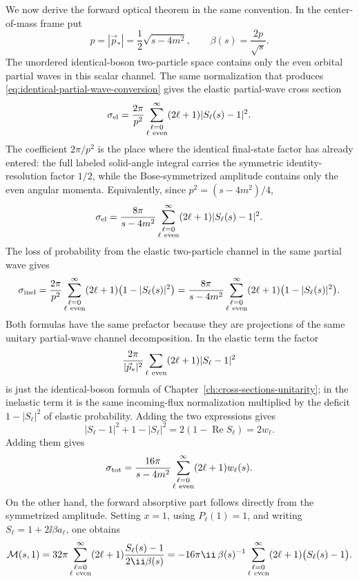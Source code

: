 We now derive the forward optical theorem in the same convention.  In the
center-of-mass frame put
\[
  p=|\vec p_*|=\frac12\sqrt{s-4m^2},
  \qquad
  \beta(s)=\frac{2p}{\sqrt s}.
\]
The unordered identical-boson two-particle space contains only the even
orbital partial waves in this scalar channel.  The same normalization that
produces \eqref{eq:identical-partial-wave-conversion} gives the elastic
partial-wave cross section
\[
  \sigma_{\rm el}
  =
  \frac{2\pi}{p^2}
  \sum_{\substack{\ell=0\\ \ell\ {\rm even}}}^{\infty}
  (2\ell+1)|S_\ell(s)-1|^2 .
\]
The coefficient \(2\pi/p^2\) is the place where the identical final-state
factor has already entered: the full labeled solid-angle integral carries the
symmetric identity-resolution factor \(1/2\), while the Bose-symmetrized
amplitude contains only the even angular momenta.
Equivalently, since \(p^2=(s-4m^2)/4\),
\[
  \sigma_{\rm el}
  =
  \frac{8\pi}{s-4m^2}
  \sum_{\substack{\ell=0\\ \ell\ {\rm even}}}^{\infty}
  (2\ell+1)|S_\ell(s)-1|^2 .
\]
The loss of probability from the elastic two-particle channel in the same
partial wave gives
\[
  \sigma_{\rm inel}
  =
  \frac{2\pi}{p^2}
  \sum_{\substack{\ell=0\\ \ell\ {\rm even}}}^{\infty}
  (2\ell+1)\bigl(1-|S_\ell(s)|^2\bigr)
  =
  \frac{8\pi}{s-4m^2}
  \sum_{\substack{\ell=0\\ \ell\ {\rm even}}}^{\infty}
  (2\ell+1)\bigl(1-|S_\ell(s)|^2\bigr).
\]
Both formulas have the same prefactor because they are projections of the same
unitary partial-wave channel decomposition.  In the elastic term the factor
\[
  \frac{2\pi}{|\vec p_*|^2}
  \sum_{\ell\ {\rm even}}(2\ell+1)|S_\ell-1|^2
\]
is just the identical-boson formula of
Chapter~\ref{ch:cross-sections-unitarity}; in the inelastic term it is the
same incoming-flux normalization multiplied by the deficit
\(1-|S_\ell|^2\) of elastic probability.  Adding the two expressions gives
\[
  |S_\ell-1|^2+1-|S_\ell|^2
  =
  2(1-\operatorname{Re}S_\ell)
  =
  2w_\ell .
\]
Adding them gives
\[
  \sigma_{\rm tot}
  =
  \frac{16\pi}{s-4m^2}
  \sum_{\substack{\ell=0\\ \ell\ {\rm even}}}^{\infty}
  (2\ell+1)w_\ell(s).
\]
On the other hand, the forward absorptive part follows directly from the
symmetrized amplitude.  Setting \(x=1\), using \(P_\ell(1)=1\), and writing
\(S_\ell=1+2\ii\beta a_\ell\), one obtains
\[
  \mathcal M(s,1)
  =
  32\pi
  \sum_{\substack{\ell=0\\ \ell\ {\rm even}}}^{\infty}
  (2\ell+1)\frac{S_\ell(s)-1}{2\ii\beta(s)}
  =
  -16\pi\ii\,\beta(s)^{-1}
  \sum_{\substack{\ell=0\\ \ell\ {\rm even}}}^{\infty}
  (2\ell+1)\bigl(S_\ell(s)-1\bigr).
\]
